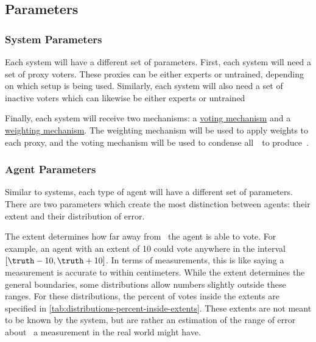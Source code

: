 \subsection{Parameters}\label{subsec:parameters}

\subsubsection{System Parameters}\label{subsubsec:system-parameters}
Each system will have a different set of parameters.
First, each system will need a set of proxy voters.
These proxies can be either experts or untrained, depending on which setup is
being used.
Similarly, each system will also need a set of inactive voters which can likewise
be either experts or untrained

Finally, each system will receive two mechanisms: a
\hyperref[subsec:voting-mechanisms]{voting mechanism} and a
\hyperref[subsec:weighting-mechanisms]{weighting mechanism}.
The weighting mechanism will be used to apply weights to each proxy, and the
voting mechanism will be used to condense all~\agenttruth\ to produce~\systemtruth.

\subsubsection{Agent Parameters}\label{subsubsec:agent-parameters}
Similar to systems, each type of agent will have a different set of parameters.
There are two parameters which create the most distinction between agents: their
extent and their distribution of error.

The extent determines how far away from \truth\ the agent is able to vote.
For example, an agent with an extent of 10 could vote anywhere in the
interval $[\truth - 10, \truth + 10]$.
In terms of measurements, this is like saying a measurement is accurate to within
 centimeters.
While the extent determines the general boundaries, some distributions allow
numbers slightly outside these ranges.
For these distributions, the percent of votes inside the extents are
specified in \autoref{tab:distributions-percent-inside-extents}.
These extents are not meant to be known  by the system, but are rather an
estimation of the range of error about \truth\ a measurement in the real world
might have.

